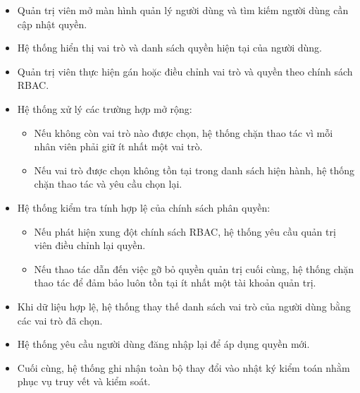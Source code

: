 \begin{itemize}
    \item Quản trị viên mở màn hình quản lý người dùng và tìm kiếm người dùng cần cập nhật quyền.
    
    \item Hệ thống hiển thị vai trò và danh sách quyền hiện tại của người dùng.
    
    \item Quản trị viên thực hiện gán hoặc điều chỉnh vai trò và quyền theo chính sách RBAC.
    
    \item Hệ thống xử lý các trường hợp mở rộng:
    \begin{itemize}
        \item Nếu không còn vai trò nào được chọn, hệ thống chặn thao tác vì mỗi nhân viên phải giữ ít nhất một vai trò.
        \item Nếu vai trò được chọn không tồn tại trong danh sách hiện hành, hệ thống chặn thao tác và yêu cầu chọn lại.
    \end{itemize}
    
    \item Hệ thống kiểm tra tính hợp lệ của chính sách phân quyền:
    \begin{itemize}
        \item Nếu phát hiện xung đột chính sách RBAC, hệ thống yêu cầu quản trị viên điều chỉnh lại quyền.
        \item Nếu thao tác dẫn đến việc gỡ bỏ quyền quản trị cuối cùng, hệ thống chặn thao tác để đảm bảo luôn tồn tại ít nhất một tài khoản quản trị.
    \end{itemize}
    
    \item Khi dữ liệu hợp lệ, hệ thống thay thế danh sách vai trò của người dùng bằng các vai trò đã chọn.
    
    \item Hệ thống yêu cầu người dùng đăng nhập lại để áp dụng quyền mới.
    
    \item Cuối cùng, hệ thống ghi nhận toàn bộ thay đổi vào nhật ký kiểm toán nhằm phục vụ truy vết và kiểm soát.
\end{itemize}
